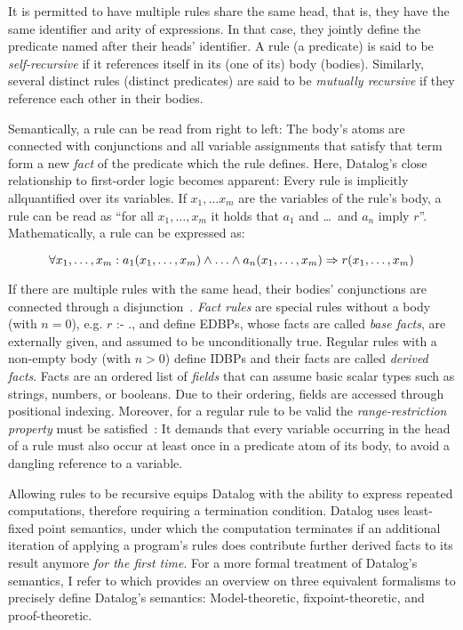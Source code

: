 It is permitted to have multiple rules share the same head, that is,
they have the same identifier and arity of expressions.
In that case, they jointly define the predicate named after their heads' identifier.
A rule (a predicate) is said to be \emph{self-recursive}
if it references itself in its (one of its) body (bodies).
Similarly, several distinct rules (distinct predicates) are said to be
\emph{mutually recursive} if they reference each other in their bodies.

Semantically, a rule can be read from right to left: The body's atoms are
connected with conjunctions and all variable assignments that satisfy that term
form a new \emph{fact} of the predicate which the rule defines.
Here, Datalog's close relationship to first-order logic becomes apparent:
Every rule is implicitly allquantified over its variables.
If \(x_1, \ldots x_m\) are the variables of the rule's body, a rule can be read as
``for all \(x_1, \ldots, x_m\) it holds that \(a_1\) and \ldots\ and \(a_n\) imply \(r\)''.
Mathematically, a rule can be expressed as\footnotemark{}:


\begin{equation}
	\forall x_1, \ldots, x_m: a_1(x_1, \ldots, x_m) \land \ldots \land a_n(x_1, \ldots, x_m) \Rightarrow r(x_1, \ldots, x_m) \\
\end{equation}

If there are multiple rules with the same head, their bodies' conjunctions
are connected through a disjunction~\cite{abo2024convergence}.
\emph{Fact rules} are special rules without a body (with $n=0$), e.g.
\( r \text{ :- } .\), and define \acp{EDBP}, whose facts are called
\emph{base facts}, are externally given, and assumed to be unconditionally true.
Regular rules with a non-empty body (with $n>0$) define \acp{IDBP}
and their facts are called \emph{derived facts}.
Facts are an ordered list of \emph{fields} that can assume basic scalar
types such as strings, numbers, or booleans.
Due to their ordering, fields are accessed through positional indexing.
Moreover, for a regular rule to be valid the \emph{range-restriction property}
must be satisfied~\cite{green2013datalog}:
It demands that every variable occurring in the head of a rule must also occur
at least once in a predicate atom of its body, to avoid a dangling reference
to a variable.

Allowing rules to be recursive equips Datalog with the ability to express
repeated computations, therefore requiring a termination condition.
Datalog uses least-fixed point semantics, under which the computation terminates
if an additional iteration of applying a program's rules does contribute further
derived facts to its result anymore \emph{for the first time}.
For a more formal treatment of Datalog's semantics, I refer to \cite{green2013datalog}
which provides an overview on three equivalent formalisms to precisely define
Datalog's semantics: Model-theoretic, fixpoint-theoretic, and proof-theoretic.

